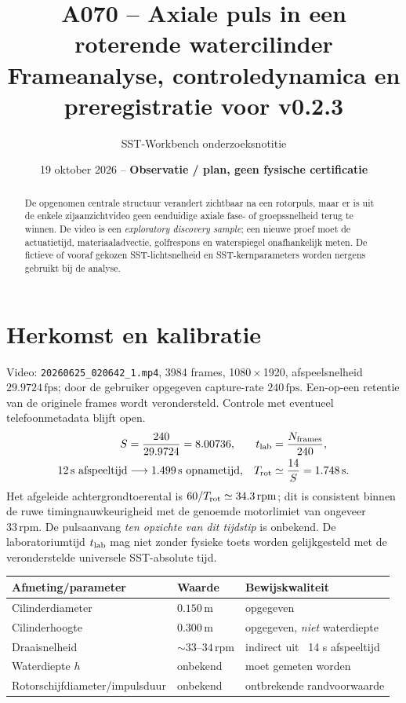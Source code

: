 \documentclass[10pt,a4paper]{article}
\title{\vspace{-1.3em}A070 -- Axiale puls in een roterende watercilinder\\[2mm]
\large Frameanalyse, controledynamica en preregistratie voor v0.2.3}
\author{SST-Workbench onderzoeksnotitie}
\date{19 oktober 2026 -- \textbf{Observatie / plan, geen fysische certificatie}}
\begin{document}
\maketitle\vspace{-2em}
\begin{abstract}
De opgenomen centrale structuur verandert zichtbaar na een rotorpuls, maar er is uit de enkele zijaanzichtvideo geen eenduidige axiale fase- of groepssnelheid terug te winnen. De video is een \emph{exploratory discovery sample}; een nieuwe proef moet de actuatietijd, materiaaladvectie, golfrespons en waterspiegel onafhankelijk meten. De fictieve of vooraf gekozen SST-lichtsnelheid en SST-kernparameters worden nergens gebruikt bij de analyse.
\end{abstract}
\section{Herkomst en kalibratie}
Video: \texttt{20260625\_020642\_1.mp4}, 3984 frames, 1080\,$\times$\,1920, afspeelsnelheid $29.9724\,\mathrm{fps}$; door de gebruiker opgegeven capture-rate $240\,\mathrm{fps}$. Een-op-een retentie van de originele frames wordt verondersteld. Controle met eventueel telefoonmetadata blijft open.
\begin{align}
S&=\frac{240}{29.9724}=8.00736, & t_{\mathrm{lab}}&=\frac{N_{\mathrm{frames}}}{240},\\
12\,\mathrm{s}\ \text{afspeeltijd}&\longrightarrow 1.499\,\mathrm{s}\ \text{opnametijd}, & T_{\rm rot}&\simeq\frac{14}{S}=1.748\,\mathrm s.
\end{align}
Het afgeleide achtergrondtoerental is $60/T_{\rm rot}\simeq34.3\,\mathrm{rpm}$; dit is consistent binnen de ruwe timingnauwkeurigheid met de genoemde motorlimiet van ongeveer $33\,\mathrm{rpm}$. De pulsaanvang \emph{ten opzichte van dit tijdstip} is onbekend. De laboratoriumtijd $t_{\rm lab}$ mag niet zonder fysieke toets worden gelijkgesteld met de veronderstelde universele SST-absolute tijd.

\begin{center}\begin{tabular}{lll}\toprule
Afmeting/parameter & Waarde & Bewijskwaliteit\\\midrule
Cilinderdiameter & $0.150\,\mathrm m$ & opgegeven\\
Cilinderhoogte & $0.300\,\mathrm m$ & opgegeven, \emph{niet} waterdiepte\\
Draaisnelheid & $\sim33$--$34\,\mathrm{rpm}$ & indirect uit ~14 s afspeeltijd\\
Waterdiepte $h$ & onbekend & moet gemeten worden\\
Rotorschijfdiameter/impulsduur & onbekend & ontbrekende randvoorwaarde\\
\bottomrule\end{tabular}\end{center}
\end{document}
